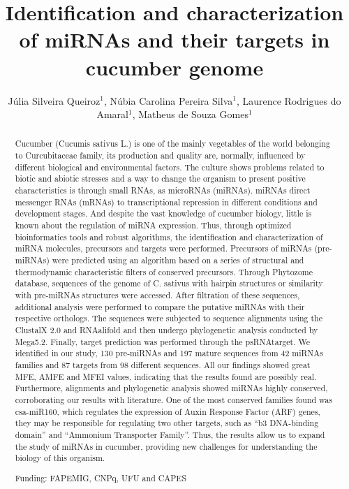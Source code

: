 \documentclass[twoside]{article}
\title{\vspace{-15mm}\fontsize{24pt}{10pt}\selectfont\textbf{Identification and characterization of miRNAs and their targets in cucumber genome}} %
\author{J\'ulia Silveira Queiroz$^1$, N\'ubia Carolina Pereira Silva$^1$, Laurence Rodrigues do Amaral$^1$, Matheus de Souza Gomes$^1$}
\affil{1 UFU\\ }
\date{}
\begin{document}
\maketitle %

\thispagestyle{fancy} %


\begin{abstract}
Cucumber (Cucumis sativus L.) is one of the mainly vegetables of the world belonging to Curcubitaceae family, its production and quality are, normally, influenced by different biological and environmental factors. The culture shows problems related to biotic and abiotic stresses and a way to change the organism to present positive characteristics is through small RNAs, as microRNAs (miRNAs). miRNAs direct messenger RNAs (mRNAs) to transcriptional repression in different conditions and development stages. And despite the vast knowledge of cucumber biology, little is known about the regulation of miRNA expression. Thus, through optimized bioinformatics tools and robust algorithms, the identification and characterization of miRNA molecules, precursors and targets were performed. Precursors of miRNAs (pre-miRNAs) were predicted using an algorithm based on a series of structural and thermodynamic characteristic filters of conserved precursors. Through Phytozome database, sequences of the genome of C. sativus with hairpin structures or similarity with pre-miRNAs structures were accessed. After filtration of these sequences, additional analysis were performed to compare the putative miRNAs with their respective orthologs. The sequences were subjected to sequence alignments using the ClustalX 2.0 and RNAalifold and then undergo phylogenetic analysis conducted by Mega5.2. Finally, target prediction was performed through the psRNAtarget. We identified in our study, 130 pre-miRNAs and 197 mature sequences from 42 miRNAs families and 87 targets from 98 different sequences. All our findings showed great MFE, AMFE and MFEI values, indicating that the results found are possibly real. Furthermore, alignments and phylogenetic analysis showed miRNAs highly conserved, corroborating our results with literature. One of the most conserved families found was csa-miR160, which regulates the expression of Auxin Response Factor (ARF) genes, they may be responsible for regulating two other targets, such as ``b3 DNA-binding domain'' and ``Ammonium Transporter Family''. Thus, the results allow us to expand the study of miRNAs in cucumber, providing new challenges for understanding the biology of this organism.

Funding: FAPEMIG, CNPq, UFU and CAPES
\end{abstract}
\end{document}
